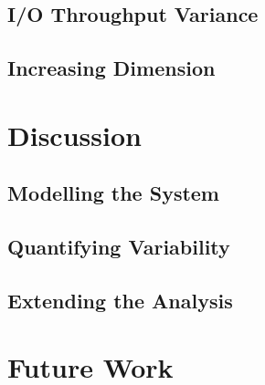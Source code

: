 \documentclass{scspaperproc}
\theoremstyle{scsthe}
\begin{document}
\subsection{I/O Throughput Variance}
\subsection{Increasing Dimension}


\section{Discussion}
\subsection{Modelling the System}
\subsection{Quantifying Variability}
\subsection{Extending the Analysis}

\section{Future Work}




\end{document}
